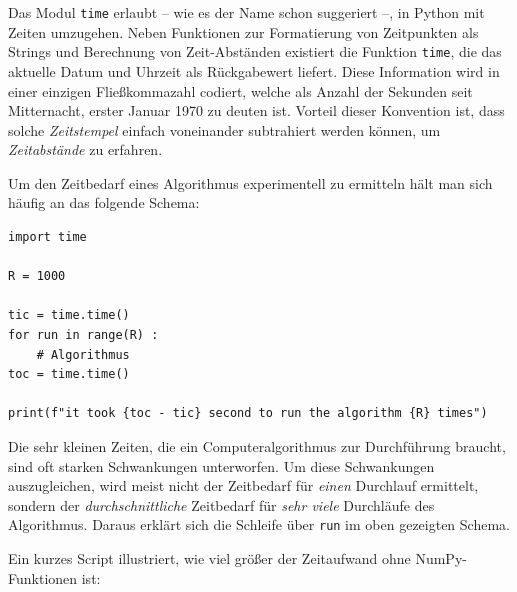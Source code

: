\begin{hintbox}
Das Modul \texttt{time} erlaubt -- wie es der Name schon suggeriert --, in Python mit Zeiten umzugehen. Neben Funktionen zur Formatierung von Zeitpunkten als Strings und Berechnung von Zeit-Abständen existiert die Funktion \texttt{time}, die das aktuelle Datum und Uhrzeit als Rückgabewert liefert. Diese Information wird in einer einzigen Fließkommazahl codiert, welche als Anzahl der Sekunden seit Mitternacht, erster Januar 1970 zu deuten ist. Vorteil dieser Konvention ist, dass solche \emph{Zeitstempel} einfach voneinander subtrahiert werden können, um \emph{Zeitabstände} zu erfahren.

Um den Zeitbedarf eines Algorithmus experimentell zu ermitteln hält man sich häufig an das folgende Schema:
\begin{codebox}
\begin{verbatim}
import time

R = 1000

tic = time.time()
for run in range(R) :
    # Algorithmus
toc = time.time()

print(f"it took {toc - tic} second to run the algorithm {R} times")
\end{verbatim}
\end{codebox}

Die sehr kleinen Zeiten, die ein Computeralgorithmus zur Durchführung braucht, sind oft starken Schwankungen unterworfen. Um diese Schwankungen auszugleichen, wird meist nicht der Zeitbedarf für \emph{einen} Durchlauf ermittelt, sondern der \emph{durchschnittliche} Zeitbedarf für \emph{sehr viele} Durchläufe des Algorithmus. Daraus erklärt sich die Schleife über \texttt{run} im oben gezeigten Schema.
\end{hintbox}

Ein kurzes Script illustriert, wie viel größer der Zeitaufwand ohne NumPy-Funktionen ist:

